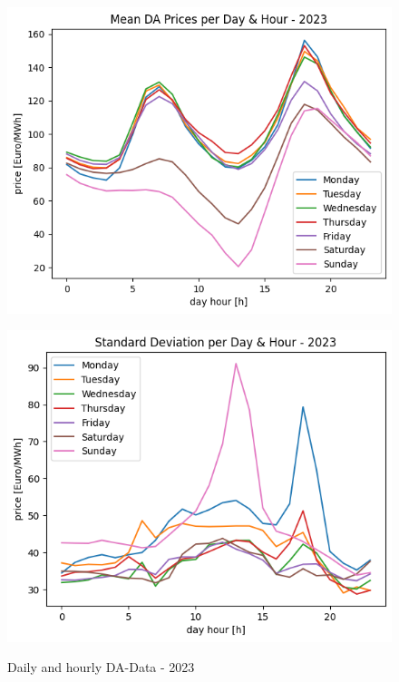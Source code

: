 \begin{figure}[H]
	\centering
	\begin{minipage}{0.49\textwidth}
		\includegraphics[width=1\linewidth]{pictures/DA/Mean DA Prices per Day and Hour - 2023.png}
		\label{fig:meanDA2023}
	\end{minipage} \hfill
	\begin{minipage}{0.49\textwidth}
		\includegraphics[width=1\linewidth]{pictures/DA/Standard Deviation per Day and Hour - 2023.png}
		\label{fig:stdDA2023}
	\end{minipage}
	\caption{Daily and hourly DA-Data - 2023 }
\end{figure}

